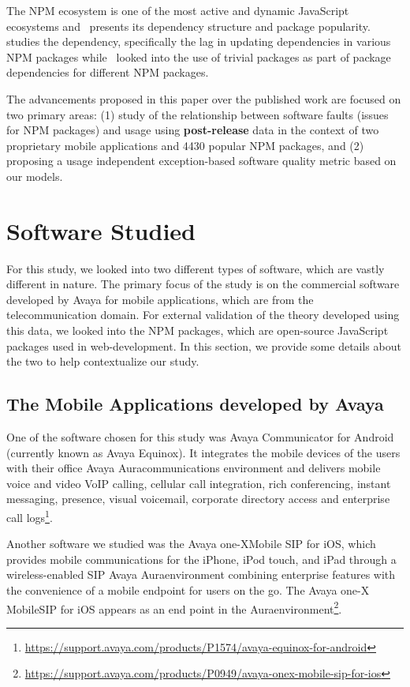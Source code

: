 \documentclass[smallextended]{svjour3}       %
\begin{document}
The NPM ecosystem is one of the most active and dynamic JavaScript ecosystems and~\cite{wittern2016look} presents its dependency structure and package popularity.~\cite{zerouali2018empirical} studies the dependency, specifically the lag in updating dependencies in various NPM packages while~\cite{abdalkareem2017developers} looked into the use of trivial packages as part of package dependencies for different NPM packages. 


The advancements proposed in this paper over the published work are focused 
on two primary areas: (1) study of the relationship between software faults (issues for NPM packages) and usage using \textbf{post-release} data in the context of two proprietary mobile applications and 4430 popular NPM packages, and (2) proposing a usage independent exception-based software quality metric based on our models.



\section{Software Studied}\label{s:soft}

For this study, we looked into two different types of software, which are vastly different in nature. The primary focus of the study is on the commercial software developed by Avaya for mobile applications, which are from the telecommunication domain. For external validation of the theory developed using this data, we looked into the NPM packages, which are open-source JavaScript packages used in web-development. In this section, we provide some details about the two to help contextualize our study.

\vspace{-10pt}
\subsection{The Mobile Applications developed by Avaya}
One of the software chosen for this study was Avaya Communicator for
Android (currently known as Avaya Equinox\textregistered ). It
integrates the mobile devices of the users with their office Avaya
Aura\textregistered communications environment and delivers mobile
voice and video VoIP calling, cellular call integration, rich
conferencing, instant messaging, presence, visual voicemail,
corporate directory access and enterprise call logs\footnote{\url{https://support.avaya.com/products/P1574/avaya-equinox-for-android}}.

Another software we studied was the Avaya one-X\textregistered Mobile  SIP for  iOS, which provides mobile communications for the iPhone, iPod touch, and iPad through a wireless-enabled SIP Avaya Aura\textregistered environment combining enterprise features with the convenience of a mobile endpoint for users on the go. The Avaya one-X Mobile\textregistered SIP for iOS appears as an end point in the Aura\textregistered environment\footnote{\url{https://support.avaya.com/products/P0949/avaya-onex-mobile-sip-for-ios}}.
\end{document}
